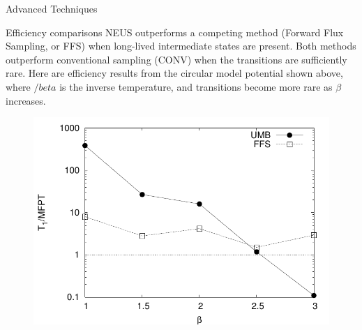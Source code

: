 \documentclass[final]{beamer}
\begin{document}
\begin{columns}[t]
\begin{column}{.25 \linewidth}
\begin{block}{Advanced Techniques}
        \end{block}

	\begin{block}{Efficiency comparisons}
	  NEUS outperforms a competing method (Forward Flux Sampling, or FFS) when long-lived intermediate states are present.  Both methods outperform conventional sampling (CONV) when the transitions are sufficiently rare.
	  Here are efficiency results from the circular model potential shown above, where $/beta$ is the inverse temperature, and transitions become more rare as $\beta$ increases.
	  \begin{figure}
	    \includegraphics[width=0.5\linewidth]{images/master.pdf}
	  \end{figure}
	\end{block}

      \end{column}


\end{columns}
\end{document}
